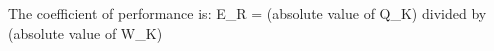 The coefficient of performance is:  
E_R = (absolute value of Q_K) divided by (absolute value of W_K)
